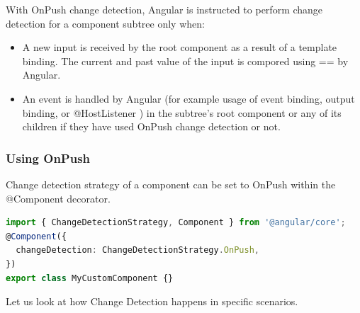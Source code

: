 \documentclass{report}
\begin{document}
With OnPush change detection, Angular is instructed to perform change detection for a component subtree only when:
\begin{itemize}
	\item{A new input is received by the root component as a result of a template binding. The current and past value of the input is compored using == by Angular.}
\item{An event is handled by Angular (for example usage of event binding, output binding, or @HostListener ) in the subtree's root component or any of its children if they have used OnPush change detection or not.}
\end{itemize}

\subsubsection*{Using OnPush}
Change detection strategy of a component can be set to OnPush within the @Component decorator.

\begin{lstlisting}[language=Typescript]
import { ChangeDetectionStrategy, Component } from '@angular/core';
@Component({
  changeDetection: ChangeDetectionStrategy.OnPush,
})
export class MyCustomComponent {}
\end{lstlisting}

Let us look at how Change Detection happens in specific scenarios.
\end{document}
